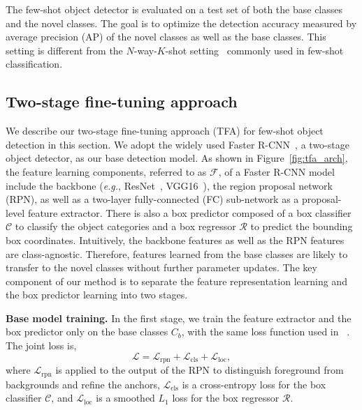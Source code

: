 \documentclass{article}
\newcommand{\model}{TFA\xspace}
\newcommand\minisection[1]{\vspace{1mm}\noindent \textbf{#1}}
\begin{document}
The few-shot object detector is evaluated on a test set of both the base classes and
the novel classes. The goal is to optimize the detection accuracy measured by average precision (AP)
of the novel classes as well as the base classes. This setting is different from the $N$-way-$K$-shot setting~\cite{finn2017model,vinyals2016matching,snell2017prototypical}
commonly used in few-shot classification. 

\subsection{Two-stage fine-tuning approach}
\label{sec:tfa}
We describe our two-stage fine-tuning approach (\model) for few-shot object detection in
this section. We adopt the widely used Faster R-CNN~\cite{ren2015faster}, a two-stage object
detector, as our base detection model. As shown in Figure~\ref{fig:tfa_arch}, the feature learning components, referred to as $\mathcal{F}$, of a Faster R-CNN model include the backbone (\textit{e.g.}, ResNet~\cite{he2016deep}, VGG16~\cite{simonyan2014very}), the region proposal network (RPN), as well as a two-layer
fully-connected (FC) sub-network as a proposal-level feature extractor. 
There is also a box predictor composed of a box classifier $\mathcal{C}$ to classify the
object categories and a box regressor $\mathcal{R}$ to predict the bounding box coordinates. 
Intuitively, the backbone features as well as the RPN features
are class-agnostic. Therefore, features learned from the base classes are likely to transfer
to the novel classes without further parameter updates. The key component of our method is to separate the
feature representation learning and the box predictor learning into two stages. 

\minisection{Base model training.} In the first stage, we train the feature extractor 
and the box predictor only on the base classes $C_b$, with the same loss function used in ~\citet{ren2015faster}. The joint loss is, 
\begin{equation}
    \mathcal{L} = \mathcal{L}_{\text{rpn}} + \mathcal{L}_{\text{cls}} + \mathcal{L}_{\text{loc}},
    \label{eq:loss}
\end{equation}
where $\mathcal{L}_\text{rpn}$ is applied
to the output of the RPN to distinguish foreground from backgrounds and refine the
anchors, $\mathcal{L}_\text{cls}$ is a cross-entropy loss for the box classifier $\mathcal{C}$,
and $\mathcal{L}_\text{loc}$ is a smoothed $L_1$ loss for the box regressor $\mathcal{R}$.
\end{document}

